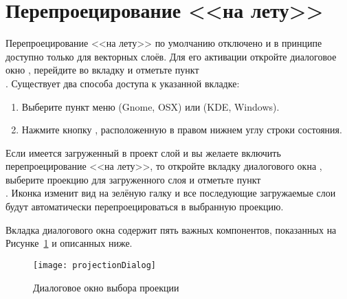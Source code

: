 \section{Перепроецирование <<на лету>>}\label{label_projstart}

Перепроецирование <<на лету>> по умолчанию отключено и в принципе доступно
только для векторных слоёв. Для его активации откройте диалоговое окно
, перейдите во вкладку
 и отметьте пункт \\
. Существует два
способа доступа к указанной вкладке:

\begin{enumerate}
\item Выберите пункт  меню
 (Gnome, OSX) или  (KDE,
Windows).
\item Нажмите кнопку , расположенную в правом нижнем углу строки состояния.
\end{enumerate}

Если имеется загруженный в проект слой и вы желаете включить перепроецирование
<<на лету>>, то откройте вкладку  диалогового окна
, выберите проекцию для загруженного слоя и
отметьте пункт \\
. Иконка
 изменит вид
на зелёную галку и все последующие загружаемые слои будут автоматически
перепроецироваться в выбранную проекцию.

Вкладка  диалогового окна 
содержит пять важных компонентов, показанных на Рисунке~\ref{fig:projections} и
описанных ниже.

\begin{figure}[ht]
   \centering
   \texttt{[image: projectionDialog]}
   \caption{Диалоговое окно выбора проекции \wincaption}\label{fig:projections}
\end{figure}

